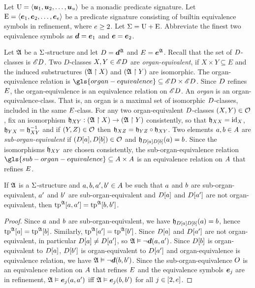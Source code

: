 
Let $\mathrm{U} = \left\langle \bm{u}_{1},\bm{u}_{2},\dots,\bm{u}_{u} \right\rangle$ be a monadic predicate signature.
Let $\mathrm{E} = \left\langle \bm{e}_{1},\bm{e}_{2},\dots,\bm{e}_{e} \right\rangle$ be a predicate signature consisting
of builtin equivalence symbols in refinement, where $e \geq 2$.
Let $\mathrm{\Sigma} = \mathrm{U} + \mathrm{E}$.
Abbreviate the finest two equivalence symbols as $\bm{d} = \bm{e}_{1}$ and $\bm{e} =
\bm{e}_{2}$.

\begin{definition}
Let $\mathfrak{A}$ be a $\mathrm{\Sigma}$-structure and let $D = \bm{d}^{\mathfrak{A}}$ and
$E = \bm{e}^{\mathfrak{A}}$.
Recall that the set of $D$-classes is ${\mathscr{E}D}$.
Two $D$-classes $X, Y \in {\mathscr{E}D}$ are \emph{organ-equivalent},
if $X \times Y \subseteq E$ and the induced substructures 
$(\mathfrak{A} \restriction X)$ and $(\mathfrak{A} \restriction Y)$ are isomorphic.
The organ-equivalence relation is
$\gls{organ-equivalence} \subseteq \domXX{\Ecl\relD}$.
Since $D$ refines $E$, the organ-equivalence is an equivalence relation
on ${\mathscr{E}D}$.
An \emph{organ} is an organ-equivalence-class. That is, an organ
is a maximal set of isomorphic $D$-classes, included in the same
$E$-class.
For any two organ-equivalent $D$-classes $(X, Y) \in \mathcal{O}$,
fix an isomorphism
$\mathfrak{h}_{XY} : (\mathfrak{A} \restriction X) \to (\mathfrak{A} \restriction Y)$
consistently, so that $\mathfrak{h}_{XX} = \operatorname{id}_{X}$,
$\mathfrak{h}_{YX} = \mathfrak{h}_{XY}^{-1}$
and if $(Y, Z) \in \mathcal{O}$ then
$\mathfrak{h}_{XZ} = \mathfrak{h}_{YZ} \circ \mathfrak{h}_{XY}$.
Two elements $a, b \in A$ are \emph{sub-organ-equivalent}
if $(D[a], D[b]) \in \mathcal{O}$ and
$\mathfrak{h}_{D[a]D[b]}(a) = b$.
Since the isomorphisms $\mathfrak{h}_{XY}$ are chosen consistently, the
sub-organ-equivalence relation
$\gls{sub-organ-equivalence} \subseteq \domAA$ is an equivalence relation on
$A$ that refines $E$.
\end{definition}

\begin{remark}\label{rem:twovar-same-organ-tp2}
If $\mathfrak{A}$ is a $\mathrm{\Sigma}$-structure and $a, b, {a'}, {b'} \in A$ be such
that $a$ and $b$ are sub-organ-equivalent, ${a'}$ and ${b'}$ are
sub-organ-equivalent and $D[a]$ and $D[{a'}]$ are not
organ-equivalent, then $\operatorname{tp}^{\mathfrak{A}}[a,{a'}] = \operatorname{tp}^{\mathfrak{A}}[b,{b'}]$.
\end{remark}
\begin{proof}
Since $a$ and $b$ are sub-organ-equivalent, we have
$\mathfrak{h}_{D[a]D[b]}(a) = b$,
hence $\operatorname{tp}^{\mathfrak{A}}[a] = \operatorname{tp}^{\mathfrak{A}}[b]$.
Similarly, $\operatorname{tp}^{\mathfrak{A}}[{a'}] = \operatorname{tp}^{\mathfrak{A}}[{b'}]$.
Since $D[a]$ and $D[{a'}]$ are not organ-equivalent,
in particular $D[a] \neq D[{a'}]$,
so $\mathfrak{A} \vDash \lnot \bm{d}(a,{a'})$.
Since $D[b]$ is organ-equivalent to $D[a]$, $D[{b'}]$ is
organ-equivalent to $D[{a'}]$ and organ-equivalence is equivalence relation,
we have $\mathfrak{A} \vDash \lnot \bm{d}(b, {b'})$.
Since the sub-organ-equivalence $O$ is an equivalence relation on $A$
that refines $E$ and the equivalence symbols $\bm{e}_{j}$ are in refinement,
$\mathfrak{A} \vDash \bm{e}_{j}(a, {a'})$  iff $\mathfrak{A} \vDash \bm{e}_{j}(b, {b'})$ for all 
$j \in [2,e]$.
\end{proof}

